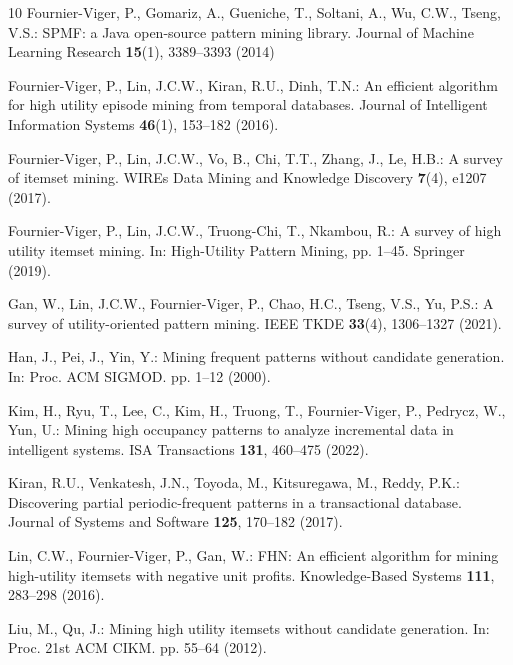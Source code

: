 \documentclass[runningheads,orivec]{llncs}
\begin{document}
\begin{thebibliography}{10}
Fournier-Viger, P., Gomariz, A., Gueniche, T., Soltani, A., Wu, C.W., Tseng, V.S.: SPMF: a Java open-source pattern mining library. Journal of Machine Learning Research \textbf{15}(1), 3389--3393 (2014)

Fournier-Viger, P., Lin, J.C.W., Kiran, R.U., Dinh, T.N.: An efficient algorithm for high utility episode mining from temporal databases. Journal of Intelligent Information Systems \textbf{46}(1), 153--182 (2016). 

Fournier-Viger, P., Lin, J.C.W., Vo, B., Chi, T.T., Zhang, J., Le, H.B.: A survey of itemset mining. WIREs Data Mining and Knowledge Discovery \textbf{7}(4), e1207 (2017). 

Fournier-Viger, P., Lin, J.C.W., Truong-Chi, T., Nkambou, R.: A survey of high utility itemset mining. In: High-Utility Pattern Mining, pp. 1--45. Springer (2019). 

Gan, W., Lin, J.C.W., Fournier-Viger, P., Chao, H.C., Tseng, V.S., Yu, P.S.: A survey of utility-oriented pattern mining. IEEE TKDE \textbf{33}(4), 1306--1327 (2021). 

Han, J., Pei, J., Yin, Y.: Mining frequent patterns without candidate generation. In: Proc. ACM SIGMOD. pp. 1--12 (2000). 

Kim, H., Ryu, T., Lee, C., Kim, H., Truong, T., Fournier-Viger, P., Pedrycz, W., Yun, U.: Mining high occupancy patterns to analyze incremental data in intelligent systems. ISA Transactions \textbf{131}, 460--475 (2022). 

Kiran, R.U., Venkatesh, J.N., Toyoda, M., Kitsuregawa, M., Reddy, P.K.: Discovering partial periodic-frequent patterns in a transactional database. Journal of Systems and Software \textbf{125}, 170--182 (2017). 

Lin, C.W., Fournier-Viger, P., Gan, W.: FHN: An efficient algorithm for mining high-utility itemsets with negative unit profits. Knowledge-Based Systems \textbf{111}, 283--298 (2016). 

Liu, M., Qu, J.: Mining high utility itemsets without candidate generation. In: Proc. 21st ACM CIKM. pp. 55--64 (2012). 


\end{thebibliography}
\end{document}

